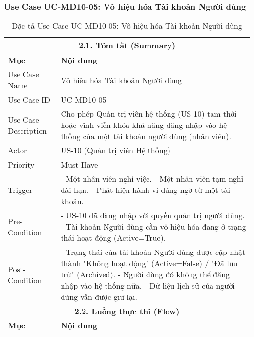 \subsubsection{Use Case UC-MD10-05: Vô hiệu hóa Tài khoản Người dùng}
\begin{longtable}{|m{4cm}|p{11cm}|}
\caption{Đặc tả Use Case UC-MD10-05: Vô hiệu hóa Tài khoản Người dùng} \label{tab:uc_md10_05_full_v2_latex_fixed_in_codeblock} \\
\hline
\multicolumn{2}{|c|}{\textbf{2.1. Tóm tắt (Summary)}} \\
\hline
\textbf{Mục} & \textbf{Nội dung} \\
\hline
\endhead %
\midrule
\endfoot %
\bottomrule
\endlastfoot %
Use Case Name & Vô hiệu hóa Tài khoản Người dùng \\
\hline
Use Case ID & UC-MD10-05 \\
\hline
Use Case Description & Cho phép Quản trị viên hệ thống (US-10) tạm thời hoặc vĩnh viễn khóa khả năng đăng nhập vào hệ thống của một tài khoản người dùng (nhân viên). \\
\hline
Actor & US-10 (Quản trị viên Hệ thống) \\
\hline
Priority & Must Have \\
\hline
Trigger & - Một nhân viên nghỉ việc. \newline - Một nhân viên tạm nghỉ dài hạn. \newline - Phát hiện hành vi đáng ngờ từ một tài khoản. \\
\hline
Pre-Condition & - US-10 đã đăng nhập với quyền quản trị người dùng. \newline - Tài khoản Người dùng cần vô hiệu hóa đang ở trạng thái hoạt động (Active=True). \\
\hline
Post-Condition & - Trạng thái của tài khoản Người dùng được cập nhật thành "Không hoạt động" (Active=False) / "Đã lưu trữ" (Archived). \newline - Người dùng đó không thể đăng nhập vào hệ thống nữa. \newline - Dữ liệu lịch sử của người dùng vẫn được giữ lại. \\
\hline
\multicolumn{2}{|c|}{\textbf{2.2. Luồng thực thi (Flow)}} \\
\hline
\textbf{Mục} & \textbf{Nội dung} \\
\hline

\end{longtable}

